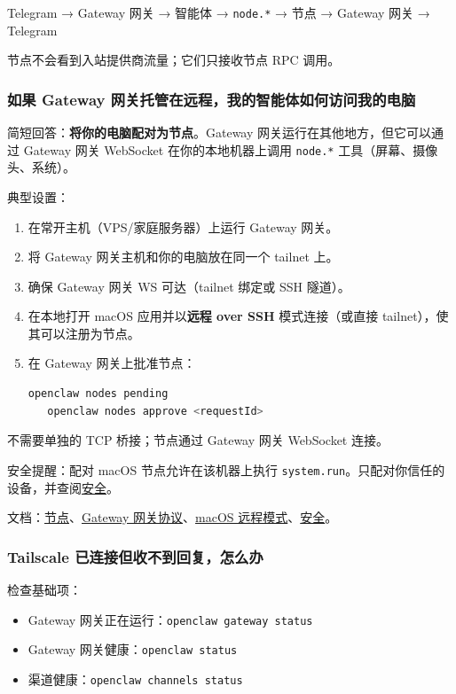 Telegram → Gateway 网关 → 智能体 → \texttt{node.*} → 节点 → Gateway 网关 → Telegram

节点不会看到入站提供商流量；它们只接收节点 RPC 调用。

\subsubsection{如果 Gateway 网关托管在远程，我的智能体如何访问我的电脑}


简短回答：\textbf{将你的电脑配对为节点}。Gateway 网关运行在其他地方，但它可以通过 Gateway 网关 WebSocket 在你的本地机器上调用 \texttt{node.*} 工具（屏幕、摄像头、系统）。

典型设置：

\begin{enumerate}
  \item 在常开主机（VPS/家庭服务器）上运行 Gateway 网关。
  \item 将 Gateway 网关主机和你的电脑放在同一个 tailnet 上。
  \item 确保 Gateway 网关 WS 可达（tailnet 绑定或 SSH 隧道）。
  \item 在本地打开 macOS 应用并以\textbf{远程 over SSH} 模式连接（或直接 tailnet），使其可以注册为节点。
  \item 在 Gateway 网关上批准节点：
\begin{lstlisting}[language=bash]
   openclaw nodes pending
   openclaw nodes approve <requestId>
\end{lstlisting}

\end{enumerate}


不需要单独的 TCP 桥接；节点通过 Gateway 网关 WebSocket 连接。

安全提醒：配对 macOS 节点允许在该机器上执行 \texttt{system.run}。只配对你信任的设备，并查阅\href{/gateway/security}{安全}。

文档：\href{/nodes}{节点}、\href{/gateway/protocol}{Gateway 网关协议}、\href{/platforms/mac/remote}{macOS 远程模式}、\href{/gateway/security}{安全}。

\subsubsection{Tailscale 已连接但收不到回复，怎么办}


检查基础项：

\begin{itemize}
  \item Gateway 网关正在运行：\texttt{openclaw gateway status}
  \item Gateway 网关健康：\texttt{openclaw status}
  \item 渠道健康：\texttt{openclaw channels status}
\end{itemize}


